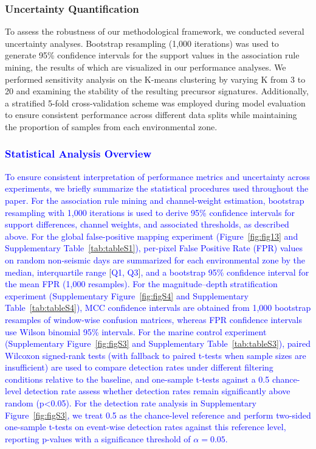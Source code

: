 \documentclass[preprint,review,12pt,authoryear]{elsarticle}
\providecommand{\DIFaddtex}[1]{{\sf #1}} %
\providecommand{\DIFaddbegin}{} %
\providecommand{\DIFadd}[1]{\texorpdfstring{\DIFaddtex{#1}}{#1}} %
\newcommand{\DIFaddincludegraphics}[2][]{{\color{blue}\fbox{\DIFOincludegraphics[#1]{#2}}}} %
\DeclareRobustCommand{\DIFaddbegin}{\DIFOaddbegin \let\includegraphics\DIFaddincludegraphics} %
\renewcommand{\DIFaddtex}[1]{\textcolor{blue}{#1}}
\begin{document}
\subsubsection{Uncertainty Quantification}\label{sec:uncertainty}
To assess the robustness of our methodological framework, we conducted several uncertainty analyses. Bootstrap resampling (1,000 iterations) was used to generate 95\% confidence intervals for the support values in the association rule mining, the results of which are visualized in our performance analyses. We performed sensitivity analysis on the K-means clustering by varying K from 3 to 20 and examining the stability of the resulting precursor signatures. Additionally, a stratified 5-fold cross-validation scheme was employed during model evaluation to ensure consistent performance across different data splits while maintaining the proportion of samples from each environmental zone.

\DIFaddbegin \subsubsection{\DIFadd{Statistical Analysis Overview}}
\DIFadd{To ensure consistent interpretation of performance metrics and uncertainty across experiments, we briefly summarize the statistical procedures used throughout the paper. For the association rule mining and channel-weight estimation, bootstrap resampling with 1,000 iterations is used to derive 95\% confidence intervals for support differences, channel weights, and associated thresholds, as described above. For the global false-positive mapping experiment (Figure~\ref{fig:fig13} and Supplementary Table~\ref{tab:tableS1}), per-pixel False Positive Rate (FPR) values on random non-seismic days are summarized for each environmental zone by the median, interquartile range }[\DIFadd{Q1, Q3}]\DIFadd{, and a bootstrap 95\% confidence interval for the mean FPR (1,000 resamples). For the magnitude--depth stratification experiment (Supplementary Figure~\ref{fig:figS4} and Supplementary Table~\ref{tab:tableS4}), MCC confidence intervals are obtained from 1,000 bootstrap resamples of window-wise confusion matrices, whereas FPR confidence intervals use Wilson binomial 95\% intervals. For the marine control experiment (Supplementary Figure~\ref{fig:figS3} and Supplementary Table~\ref{tab:tableS3}), paired Wilcoxon signed-rank tests (with fallback to paired t-tests when sample sizes are insufficient) are used to compare detection rates under different filtering conditions relative to the baseline, and one-sample t-tests against a 0.5 chance-level detection rate assess whether detection rates remain significantly above random (p<0.05). For the detection rate analysis in Supplementary Figure~\ref{fig:figS3}, we treat 0.5 as the chance-level reference and perform two-sided one-sample t-tests on event-wise detection rates against this reference level, reporting p-values with a significance threshold of $\alpha = 0.05$.
}
\end{document}
